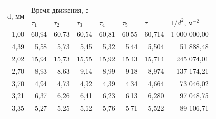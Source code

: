 \documentclass[12pt]{article}
\begin{document}
\begin{table}[H]
\begin{tabular}{|r|r|r|r|r|r|r|r|}
\hline
\multicolumn{1}{|l|}{\multirow{2}{*}{d, мм}} & \multicolumn{5}{l|}{Время движения, с}                                                                                                                   & \multicolumn{1}{l|}{}                   & \multicolumn{1}{l|}{}                                   \\ \cline{2-6}
\multicolumn{1}{|l|}{}                       & \multicolumn{1}{l|}{$\tau_1$} & \multicolumn{1}{l|}{$\tau_2$} & \multicolumn{1}{l|}{$\tau_3$} & \multicolumn{1}{l|}{$\tau_4$} & \multicolumn{1}{l|}{$\tau_5$} & \multicolumn{1}{l|}{$\overline{\tau}$} & \multicolumn{1}{l|}{$1/d^2$, м$^{-2}$} \\ \hline
1,00                                         & 60,94                        & 60,73                        & 60,54                        & 60,81                        & 60,55                        & 60,714                                  & 1 000 000,00                                            \\ \hline
4,39                                         & 5,58                         & 5,73                         & 5,45                         & 5,32                         & 5,44                         & 5,504                                   & 51 888,48                                               \\ \hline
2,02                                         & 15,94                        & 15,73                        & 15,55                        & 15,92                        & 15,43                        & 15,714                                  & 245 074,01                                              \\ \hline
2,70                                         & 8,93                         & 8,63                         & 9,14                         & 8,99                         & 9,18                         & 8,974                                   & 137 174,21                                              \\ \hline
3,70                                         & 4,94                         & 4,73                         & 4,92                         & 4,39                         & 4,34                         & 4,664                                   & 73 046,02                                               \\ \hline
3,21                                         & 6,37                         & 6,26                         & 6,41                         & 6,23                         & 6,13                         & 6,280                                   & 97 048,75                                               \\ \hline
3,35                                         & 5,27                         & 5,25                         & 5,62                         & 5,76                         & 5,71                         & 5,522                                   & 89 106,71                                               \\ \hline
\end{tabular}
\end{table}
\end{document}
